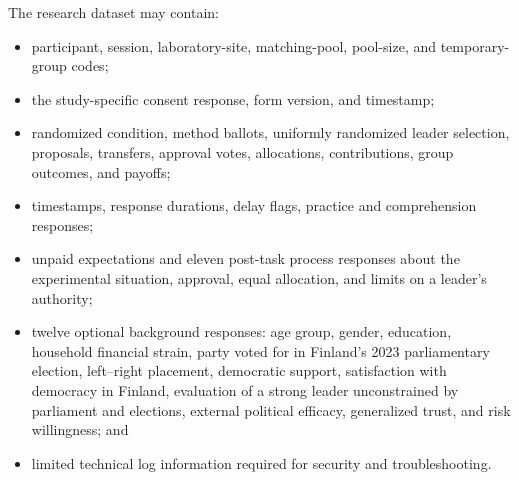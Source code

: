 The research dataset may contain:
\begin{itemize}
  \item participant, session, laboratory-site, matching-pool, pool-size, and temporary-group codes;
  \item the study-specific consent response, form version, and timestamp;
  \item randomized condition, method ballots, uniformly randomized leader selection, proposals, transfers, approval votes, allocations, contributions, group outcomes, and payoffs;
  \item timestamps, response durations, delay flags, practice and comprehension responses;
  \item unpaid expectations and eleven post-task process responses about the experimental situation, approval, equal allocation, and limits on a leader's authority;
  \item twelve optional background responses: age group, gender, education, household financial strain, party voted for in Finland's 2023 parliamentary election, left--right placement, democratic support, satisfaction with democracy in Finland, evaluation of a strong leader unconstrained by parliament and elections, external political efficacy, generalized trust, and risk willingness; and
  \item limited technical log information required for security and troubleshooting.
\end{itemize}


